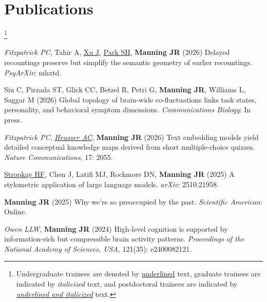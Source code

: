 \documentclass[11pt, a4paper]{article} %
\newcommand\blfootnote[1]{%
  \begingroup
  \renewcommand\thefootnote{}\footnote{#1}%
  \addtocounter{footnote}{-1}%
  \endgroup
}
\begin{document}

\section*{Publications}\blfootnote{Undergraduate trainees are denoted by
  \ul{underlined} text, graduate trainees are indicated by \textit{italicized} text, and postdoctoral trainees are indicated by \ul{\textit{underlined and italicized}} text.}

\vspace{-0.4in}
\begin{etaremune}
\item \textit{Fitzpatrick PC}, Tahir A, \ul{Xu J}, \ul{Park SH}, \textbf{Manning JR} (2026) Delayed recountings preserve but simplify the semantic geometry of earlier recountings. \textit{PsyArXiv}: mhxtd.

\item Siu C, Pirzada ST, Glick CC, Betzel R, Petri G, \textbf{Manning JR}, Williams L, Saggar M (2026) Global topology of brain-wide co-fluctuations links task states, personality, and behavioral symptom dimensions. \textit{Communications Biology}: In press.

\item \textit{Fitzpatrick PC}, \ul{\textit{Heusser AC}}, \textbf{Manning JR} (2026) Text embedding models yield detailed conceptual knowledge maps derived from short multiple-choice quizzes. \textit{Nature Communications}, 17: 2055.

\item \ul{Stropkay HF}, Chen J, Latifi MJ, Rockmore DN, \textbf{Manning JR} (2025) A stylometric application of large language models. \textit{arXiv}: 2510.21958.

\item \textbf{Manning JR} (2025) Why we're so preoccupied by the past. \textit{Scientific American}: Online.

\item \textit{Owen LLW}, \textbf{Manning JR} (2024) High-level cognition is supported by information-rich but compressible brain activity patterns. \textit{Proceedings of the National Academy of Sciences, USA}, 121(35): e2400082121.


\end{etaremune}
\end{document}
